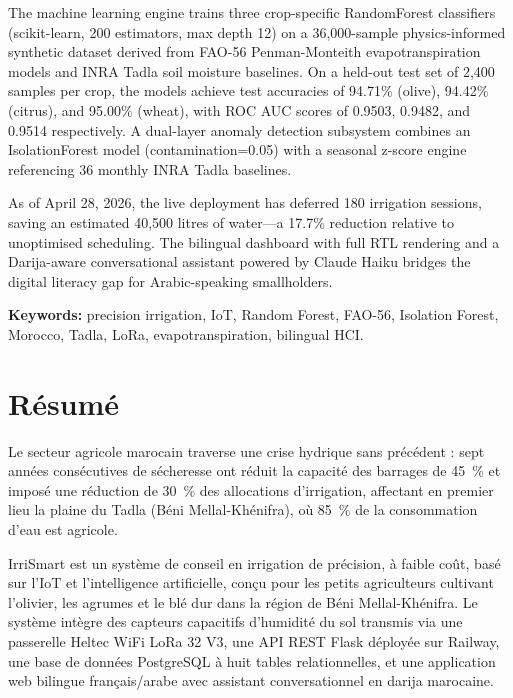 \documentclass[12pt,a4paper]{report}
\begin{document}
The machine learning engine trains three crop-specific RandomForest classifiers (scikit-learn, 200 estimators, max depth 12) on a 36,000-sample physics-informed synthetic dataset derived from FAO-56 Penman-Monteith evapotranspiration models and INRA Tadla soil moisture baselines. On a held-out test set of 2,400 samples per crop, the models achieve test accuracies of 94.71\% (olive), 94.42\% (citrus), and 95.00\% (wheat), with ROC AUC scores of 0.9503, 0.9482, and 0.9514 respectively. A dual-layer anomaly detection subsystem combines an IsolationForest model (contamination=0.05) with a seasonal z-score engine referencing 36 monthly INRA Tadla baselines.

As of April 28, 2026, the live deployment has deferred 180 irrigation sessions, saving an estimated 40,500 litres of water---a 17.7\% reduction relative to unoptimised scheduling. The bilingual dashboard with full RTL rendering and a Darija-aware conversational assistant powered by Claude Haiku bridges the digital literacy gap for Arabic-speaking smallholders.

\textbf{Keywords:} precision irrigation, IoT, Random Forest, FAO-56, Isolation Forest, Morocco, Tadla, LoRa, evapotranspiration, bilingual HCI.

\chapter*{Résumé}
\thispagestyle{fancy}

Le secteur agricole marocain traverse une crise hydrique sans précédent : sept années consécutives de sécheresse ont réduit la capacité des barrages de 45~\% et imposé une réduction de 30~\% des allocations d'irrigation, affectant en premier lieu la plaine du Tadla (Béni Mellal-Khénifra), où 85~\% de la consommation d'eau est agricole.

IrriSmart est un système de conseil en irrigation de précision, à faible coût, basé sur l'IoT et l'intelligence artificielle, conçu pour les petits agriculteurs cultivant l'olivier, les agrumes et le blé dur dans la région de Béni Mellal-Khénifra. Le système intègre des capteurs capacitifs d'humidité du sol transmis via une passerelle Heltec WiFi LoRa 32 V3, une API REST Flask déployée sur Railway, une base de données PostgreSQL à huit tables relationnelles, et une application web bilingue français/arabe avec assistant conversationnel en darija marocaine.
\end{document}
